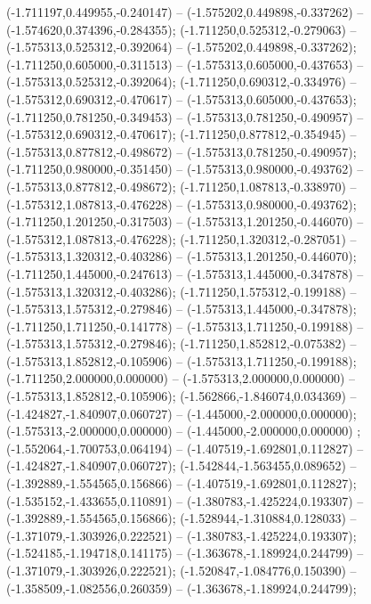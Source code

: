  (-1.711197,0.449955,-0.240147) -- (-1.575202,0.449898,-0.337262) -- (-1.574620,0.374396,-0.284355);
 (-1.711250,0.525312,-0.279063) -- (-1.575313,0.525312,-0.392064) -- (-1.575202,0.449898,-0.337262);
 (-1.711250,0.605000,-0.311513) -- (-1.575313,0.605000,-0.437653) -- (-1.575313,0.525312,-0.392064);
 (-1.711250,0.690312,-0.334976) -- (-1.575312,0.690312,-0.470617) -- (-1.575313,0.605000,-0.437653);
 (-1.711250,0.781250,-0.349453) -- (-1.575313,0.781250,-0.490957) -- (-1.575312,0.690312,-0.470617);
 (-1.711250,0.877812,-0.354945) -- (-1.575313,0.877812,-0.498672) -- (-1.575313,0.781250,-0.490957);
 (-1.711250,0.980000,-0.351450) -- (-1.575313,0.980000,-0.493762) -- (-1.575313,0.877812,-0.498672);
 (-1.711250,1.087813,-0.338970) -- (-1.575312,1.087813,-0.476228) -- (-1.575313,0.980000,-0.493762);
 (-1.711250,1.201250,-0.317503) -- (-1.575313,1.201250,-0.446070) -- (-1.575312,1.087813,-0.476228);
 (-1.711250,1.320312,-0.287051) -- (-1.575313,1.320312,-0.403286) -- (-1.575313,1.201250,-0.446070);
 (-1.711250,1.445000,-0.247613) -- (-1.575313,1.445000,-0.347878) -- (-1.575313,1.320312,-0.403286);
 (-1.711250,1.575312,-0.199188) -- (-1.575313,1.575312,-0.279846) -- (-1.575313,1.445000,-0.347878);
 (-1.711250,1.711250,-0.141778) -- (-1.575313,1.711250,-0.199188) -- (-1.575313,1.575312,-0.279846);
 (-1.711250,1.852812,-0.075382) -- (-1.575313,1.852812,-0.105906) -- (-1.575313,1.711250,-0.199188);
 (-1.711250,2.000000,0.000000) -- (-1.575313,2.000000,0.000000) -- (-1.575313,1.852812,-0.105906);
 (-1.562866,-1.846074,0.034369) -- (-1.424827,-1.840907,0.060727) -- (-1.445000,-2.000000,0.000000);
 (-1.575313,-2.000000,0.000000) -- (-1.445000,-2.000000,0.000000) ;
 (-1.552064,-1.700753,0.064194) -- (-1.407519,-1.692801,0.112827) -- (-1.424827,-1.840907,0.060727);
 (-1.542844,-1.563455,0.089652) -- (-1.392889,-1.554565,0.156866) -- (-1.407519,-1.692801,0.112827);
 (-1.535152,-1.433655,0.110891) -- (-1.380783,-1.425224,0.193307) -- (-1.392889,-1.554565,0.156866);
 (-1.528944,-1.310884,0.128033) -- (-1.371079,-1.303926,0.222521) -- (-1.380783,-1.425224,0.193307);
 (-1.524185,-1.194718,0.141175) -- (-1.363678,-1.189924,0.244799) -- (-1.371079,-1.303926,0.222521);
 (-1.520847,-1.084776,0.150390) -- (-1.358509,-1.082556,0.260359) -- (-1.363678,-1.189924,0.244799);
